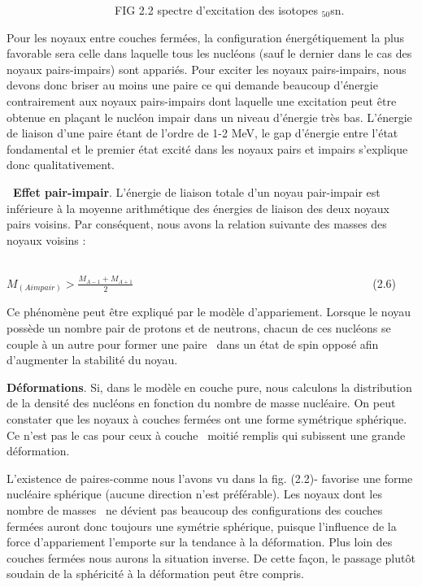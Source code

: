\documentclass[a4paper]{article}
\providecommand\textsubscript[1]{\ensuremath{{}_{\text{#1}}}}
\begin{document}
\ \ \ \ \ \ \ \ \ \ \ \ \ \ \ \ \ \ \ FIG 2.2 spectre d'excitation des isotopes \textsubscript{50}sn.

Pour les noyaux entre couches fermées, la configuration énergétiquement la plus favorable sera celle dans laquelle tous
les nucléons (sauf le dernier dans le cas des noyaux pairs-impairs) sont appariés. Pour exciter les noyaux
pairs-impairs, nous devons donc briser au moins une paire ce qui demande beaucoup d’énergie contrairement aux noyaux
pairs-impairs dont laquelle une excitation peut être obtenue en plaçant le nucléon impair dans un niveau d'énergie très
bas. L'énergie de liaison d'une paire étant de l'ordre de 1-2 MeV, le gap d’énergie entre l'état fondamental et le
premier état excité dans les noyaux pairs et impairs s'explique donc qualitativement.

\textbf{\ Effet pair-impair}. L'énergie de liaison totale d'un noyau pair-impair est inférieure à la moyenne
arithmétique des énergies de liaison des deux noyaux pairs voisins. Par conséquent, nous avons la relation suivante des
masses des noyaux voisins :

\ \ \ \ \ \ \ \ \ \ \ \ \ \ \ \ \ \ \ \ \ \ \ \ \ \ \ \ \ \ \ \ \ \ \ \ \ \ \ \ \ \ \ \ \ \ \ \ \ \ \ \ \ \ 
$M_{\left(A\mathit{impair}\right)}>\frac{M_{A-1}+M_{A+1}}
2$\ \ \ \ \ \ \ \ \ \ \ \ \ \ \ \ \ \ \ \ \ \ \ \ \ \ \ \ \ \ \ \ \ \ \ \ \ \ \ \ \ \ (2.6)

Ce phénomène peut être expliqué par le modèle d’appariement. Lorsque le noyau possède un nombre pair de protons et de
neutrons, chacun de ces nucléons se couple à un autre pour former une paire \ dans un état de spin opposé afin
d’augmenter la stabilité du noyau. 

\textbf{Déformations}. Si, dans le modèle en couche pure, nous calculons la distribution de la densité des nucléons en
fonction du nombre de masse nucléaire. On peut constater que les noyaux à couches fermées ont une forme symétrique
sphérique. Ce n'est pas le cas pour ceux à couche \ moitié remplis qui subissent une grande déformation.

L'existence de paires-comme nous l'avons vu dans la fig. (2.2)- favorise une forme nucléaire sphérique (aucune direction
n'est préférable). Les noyaux dont les nombre de masses \ ne dévient pas beaucoup des configurations des couches
fermées auront donc toujours une symétrie sphérique, puisque l'influence de la force d'appariement l'emporte sur la
tendance à la déformation. Plus loin des couches fermées nous aurons la situation inverse. De cette façon, le passage
plutôt soudain de la sphéricité à la déformation peut être compris.
\end{document}

